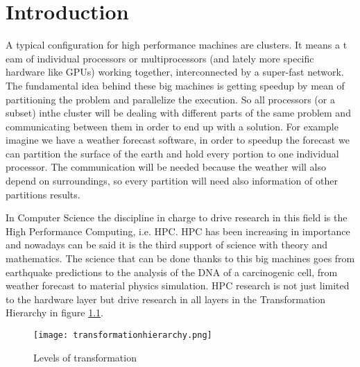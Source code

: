 \chapter{Introduction}

A typical configuration for high performance machines are clusters. It means a t
eam of individual processors or multiprocessors (and lately more specific 
hardware like GPUs) working together, interconnected by a super-fast network. 
The fundamental idea behind these big machines is getting speedup by mean of
partitioning the problem and parallelize the execution. So all processors (or a 
subset) inthe cluster will be dealing with different parts of the same problem 
and communicating between them in order to end up with a solution. For example 
imagine we have a weather forecast software, in order to speedup the forecast 
we can partition the surface of the earth and hold every portion to one individual
processor. The communication will be needed because the weather will also depend 
on surroundings, so every partition will need also information of other partitions 
results.

In Computer Science the discipline in charge to drive research in this field is 
the High Performance Computing, i.e. HPC. HPC has been increasing in importance 
and nowadays can be said it is the third support of science with theory and 
mathematics. The science that can be done thanks to this big machines goes from 
earthquake predictions to the analysis of the DNA of a carcinogenic cell, from
weather forecast to material physics simulation. HPC research is not just limited
to the hardware layer but drive research in all layers in the Transformation 
Hierarchy\cite{transformationHierarchy} in figure \ref{transformationHierarchyImg}.

\begin{figure}
  \caption{Levels of transformation}
  \label{transformationHierarchyImg}
  \centering
    \texttt{[image: transformationhierarchy.png]}
\end{figure}


